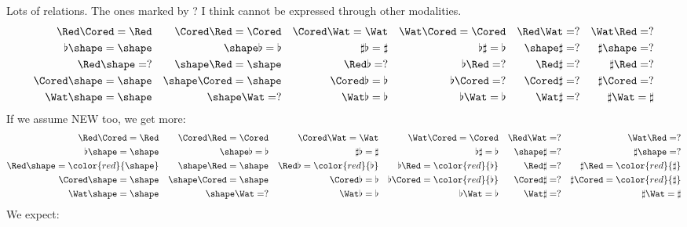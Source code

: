 \documentclass[a4paper,12pt]{article}
\begin{document}
Lots of relations. The ones marked by ? I think cannot be expressed through other modalities.
\begin{align*}
    \Red \Cored = \Red && \Cored \Red = \Cored && \Cored \Wat = \Wat && \Wat \Cored = \Cored && \Red \Wat = ? && \Wat \Red = ? \\
    \flat \shape = \shape && \shape \flat = \flat && \sharp \flat = \sharp && \flat \sharp = \flat && \shape \sharp = ? && \sharp \shape = ? \\
    \Red \shape = ? && \shape \Red = \shape && \Red \flat = ? && \flat \Red = ? && \Red \sharp = ? && \sharp \Red = ? \\
    \Cored \shape = \shape && \shape \Cored = \shape && \Cored \flat = \flat && \flat \Cored = ? && \Cored \sharp = ? && \sharp \Cored = ? \\
    \Wat \shape = \shape && \shape \Wat = ? && \Wat \flat = \flat && \flat \Wat = \flat && \Wat \sharp = ? && \sharp \Wat = \sharp
\end{align*}
If we assume NEW too, we get more:
\begin{align*}
    \Red \Cored = \Red && \Cored \Red = \Cored && \Cored \Wat = \Wat && \Wat \Cored = \Cored && \Red \Wat = ? && \Wat \Red = ? \\
    \flat \shape = \shape && \shape \flat = \flat && \sharp \flat = \sharp && \flat \sharp = \flat && \shape \sharp = ? && \sharp \shape = ? \\
    \Red \shape = \color{red}{\shape} && \shape \Red = \shape && \Red \flat = \color{red}{\flat} && \flat \Red = \color{red}{\flat} && \Red \sharp = ? && \sharp \Red = \color{red}{\sharp} \\
    \Cored \shape = \shape && \shape \Cored = \shape && \Cored \flat = \flat && \flat \Cored = \color{red}{\flat} && \Cored \sharp = ? && \sharp \Cored = \color{red}{\sharp} \\
    \Wat \shape = \shape && \shape \Wat = ? && \Wat \flat = \flat && \flat \Wat = \flat && \Wat \sharp = ? && \sharp \Wat = \sharp
\end{align*}
We expect:
\end{document}
